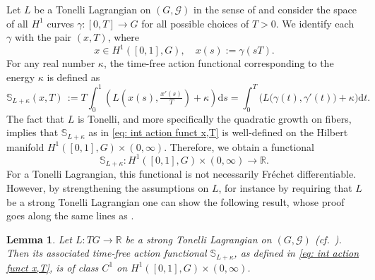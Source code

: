 \documentclass[11pt,reqno]{amsart}
\theoremstyle{plain}
\newtheorem{lem}[thm]{Lemma}
\theoremstyle{definition}
\theoremstyle{plain} %
\newtheorem{lem}[lem]{Lemma}
\theoremstyle{definition} %
\numberwithin{equation}{section}
\def\G{\mathcal{G}}
\def\d{\delta}
\def\d{\delta}
\def\RR{{\mathbb R}}
\def\d{{\mathrm{d}}}
\def\SS{{\mathbb{S}}}
\begin{document}
Let \( L \) be a Tonelli Lagrangian on $(G,\G)$ in the sense of  and consider the space of all \( H ^ 1 \) curves \( \gamma \colon [0, T] \to G \) for all possible choices of \( T > 0 \). We identify each \( \gamma \) with the pair \( (x, T) \), where
\[
    x \in H^1([0,1],G), 
    \quad 
    x(s) := \gamma(sT).
\]  
For any real number $\kappa$, the time-free action functional corresponding to the energy $\kappa$ is defined as  
\begin{equation}\label{eq: int action funct x,T}
    \SS_{L+\kappa}(x,T) \, 
    := T \int_0^1 \left( L\!\left(x(s), \tfrac{x'(s)}{T}\right) + \kappa \right) \d s
    = \int_0^T \bigg( L \big( \gamma(t), \gamma'(t) \big) + \kappa \bigg) \d t.
\end{equation}
The fact that \( L \) is Tonelli, and more specifically the quadratic growth on fibers, implies that \( \mathbb{S}_{L+\kappa} \) as in \eqref{eq: int action funct x,T} is well-defined on the Hilbert manifold \( H^1([0, 1], G) \times (0, \infty) \).
Therefore, we obtain a functional  
\[
    \SS_{L+\kappa} \colon H^1([0, 1],G) \times (0,\infty) \to \RR.
\]
For a Tonelli Lagrangian, this functional is not necessarily Fréchet differentiable. However, by strengthening the assumptions on \( L \), for instance by requiring that \( L \) be a strong Tonelli Lagrangian one can show the following result, whose proof goes along the same lines as \cite[Prop.~3.1~(i)]{AbbondandoloSchwarz2009}.
\begin{lem}\label{lem: strong tonelli implies action is c1}
    Let \( L : TG \to \mathbb{R} \) be a strong Tonelli Lagrangian on \( (G, \mathcal{G}) \) (cf.\ ). Then its associated time-free action functional \( \mathbb{S}_{L+\kappa} \), as defined in \eqref{eq: int action funct x,T}, is of class \( C^1 \) on \( H^1([0,1], G) \times (0,\infty) \).
\end{lem}
\end{document}
